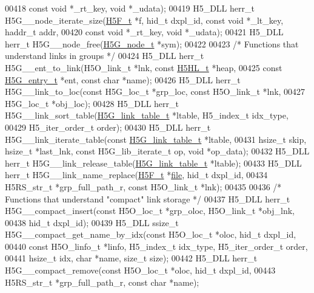 \begin{DoxyCode}
00418              \textcolor{keyword}{const} \textcolor{keywordtype}{void} *\_rt\_key, \textcolor{keywordtype}{void} *\_udata);
00419 H5\_DLL herr\_t H5G\_\_node\_iterate\_size(\hyperlink{struct_h5_f__t}{H5F\_t} *f, hid\_t dxpl\_id, \textcolor{keyword}{const} \textcolor{keywordtype}{void} *\_lt\_key, haddr\_t addr,
00420                      \textcolor{keyword}{const} \textcolor{keywordtype}{void} *\_rt\_key, \textcolor{keywordtype}{void} *\_udata);
00421 H5\_DLL herr\_t H5G\_\_node\_free(\hyperlink{struct_h5_g__node__t}{H5G\_node\_t} *sym);
00422 
00423 \textcolor{comment}{/* Functions that understand links in groups */}
00424 H5\_DLL herr\_t H5G\_\_ent\_to\_link(H5O\_link\_t *lnk, \textcolor{keyword}{const} \hyperlink{struct_h5_h_l__t}{H5HL\_t} *heap,
00425     \textcolor{keyword}{const} \hyperlink{struct_h5_g__entry__t}{H5G\_entry\_t} *ent, \textcolor{keyword}{const} \textcolor{keywordtype}{char} *name);
00426 H5\_DLL herr\_t H5G\_\_link\_to\_loc(\textcolor{keyword}{const} H5G\_loc\_t *grp\_loc, \textcolor{keyword}{const} H5O\_link\_t *lnk,
00427     H5G\_loc\_t *obj\_loc);
00428 H5\_DLL herr\_t H5G\_\_link\_sort\_table(\hyperlink{struct_h5_g__link__table__t}{H5G\_link\_table\_t} *ltable, H5\_index\_t idx\_type,
00429     H5\_iter\_order\_t order);
00430 H5\_DLL herr\_t H5G\_\_link\_iterate\_table(\textcolor{keyword}{const} \hyperlink{struct_h5_g__link__table__t}{H5G\_link\_table\_t} *ltable,
00431     hsize\_t skip, hsize\_t *last\_lnk, \textcolor{keyword}{const} H5G\_lib\_iterate\_t op, \textcolor{keywordtype}{void} *op\_data);
00432 H5\_DLL herr\_t H5G\_\_link\_release\_table(\hyperlink{struct_h5_g__link__table__t}{H5G\_link\_table\_t} *ltable);
00433 H5\_DLL herr\_t H5G\_\_link\_name\_replace(\hyperlink{struct_h5_f__t}{H5F\_t} *\hyperlink{structfile}{file}, hid\_t dxpl\_id,
00434     H5RS\_str\_t *grp\_full\_path\_r, \textcolor{keyword}{const} H5O\_link\_t *lnk);
00435 
00436 \textcolor{comment}{/* Functions that understand "compact" link storage */}
00437 H5\_DLL herr\_t H5G\_\_compact\_insert(\textcolor{keyword}{const} H5O\_loc\_t *grp\_oloc, H5O\_link\_t *obj\_lnk,
00438     hid\_t dxpl\_id);
00439 H5\_DLL ssize\_t H5G\_\_compact\_get\_name\_by\_idx(\textcolor{keyword}{const} H5O\_loc\_t *oloc, hid\_t dxpl\_id,
00440     \textcolor{keyword}{const} H5O\_linfo\_t *linfo, H5\_index\_t idx\_type, H5\_iter\_order\_t order,
00441     hsize\_t idx, \textcolor{keywordtype}{char} *name, \textcolor{keywordtype}{size\_t} size);
00442 H5\_DLL herr\_t H5G\_\_compact\_remove(\textcolor{keyword}{const} H5O\_loc\_t *oloc, hid\_t dxpl\_id,
00443     H5RS\_str\_t *grp\_full\_path\_r, \textcolor{keyword}{const} \textcolor{keywordtype}{char} *name);

\end{DoxyCode}
